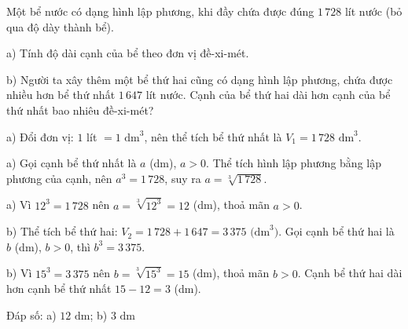 \begin{problem}[9DS-CAN-031]
Một bể nước có dạng hình lập phương, khi đầy chứa được đúng $1\,728$ lít nước (bỏ qua độ dày thành bể).

a) Tính độ dài cạnh của bể theo đơn vị đề-xi-mét.

b) Người ta xây thêm một bể thứ hai cũng có dạng hình lập phương, chứa được nhiều hơn bể thứ nhất $1\,647$ lít nước. Cạnh của bể thứ hai dài hơn cạnh của bể thứ nhất bao nhiêu đề-xi-mét?

\begin{solution}
a) Đổi đơn vị: $1$ lít $= 1 \text{ dm}^3$, nên thể tích bể thứ nhất là $V_1 = 1\,728 \text{ dm}^3$.

a) Gọi cạnh bể thứ nhất là $a$ (dm), $a > 0$. Thể tích hình lập phương bằng lập phương của cạnh, nên $a^3 = 1\,728$, suy ra $a = \sqrt[3]{1\,728}$.

a) Vì $12^3 = 1\,728$ nên $a = \sqrt[3]{12^3} = 12$ (dm), thoả mãn $a > 0$.

b) Thể tích bể thứ hai: $V_2 = 1\,728 + 1\,647 = 3\,375 \text{ (dm}^3)$. Gọi cạnh bể thứ hai là $b$ (dm), $b > 0$, thì $b^3 = 3\,375$.

b) Vì $15^3 = 3\,375$ nên $b = \sqrt[3]{15^3} = 15$ (dm), thoả mãn $b > 0$. Cạnh bể thứ hai dài hơn cạnh bể thứ nhất $15 - 12 = 3$ (dm).

Đáp số: a) $\boxed{12 \text{ dm}}$; b) $\boxed{3 \text{ dm}}$
\end{solution}
\end{problem}


